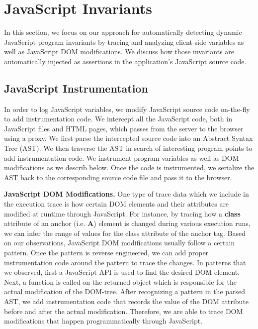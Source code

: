 \section{JavaScript Invariants}
\label{Sec:jsInvariants}
In this section, we focus on our approach for automatically detecting dynamic JavaScript program 
invariants by tracing and analyzing client-side variables as well as JavaScript DOM modifications. We discuss how
those invariants are automatically injected as assertions in the application's JavaScript source code.

\subsection{JavaScript Instrumentation}
In order to log JavaScript variables, we modify JavaScript source code on-the-fly to add instrumentation code. 
We intercept all the JavaScript code, both in JavaScript files and HTML pages,
which passes from the server to the browser using a proxy\cite{?}. We first parse the intercepted source code into 
an Abstract Syntax Tree (AST). We then traverse the AST in search of interesting program points to add instrumentation
code. We instrument program variables as well as DOM modifications as we describ below. Once the code is instrumented, we
serialize the AST back to the corresponding source code file and pass it to the browser.

{\bf JavaScript DOM Modifications.} One type of trace data which we include in the execution trace is how certain
DOM elements and their attributes are modified at runtime through JavaScript. For instance, by tracing how a {\bf class}
attribute of an anchor (i.e. {\bf A}) element is changed during various execution runs, we can infer the range of values for
the class attribute of the anchor tag. Based on our observations, JavaScript DOM modifications usually follow a certain pattern.
Once the pattern is reverse engineered, we can add proper instrumentation code around the pattern to trace the changes.
In patterns that we observed, first a JavaScript API is used to find the desired DOM element. Next, a function is called on the returned object
which is responsible for the actual modification of the DOM-tree.
After recognizing a pattern in the parsed AST, we add instrumentation code that records the value of the
DOM attribute before and after the actual modification. Therefore, we are able to trace DOM modifications that happen programmatically through JavaScript.

